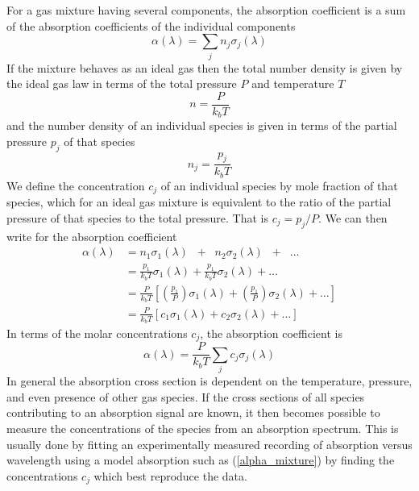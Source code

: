 For a gas mixture having several components, the absorption coefficient is a sum of the absorption coefficients of the individual components
\begin{equation}
	\alpha(\lambda) = \sum_j n_j \sigma_j(\lambda)
\end{equation}
If the mixture behaves as an ideal gas then the total number density is given by the ideal gas law in terms of the total pressure $P$ and temperature $T$
\begin{equation}
	n = \frac{P}{k_b T}
\end{equation}
and the number density of an individual species is given in terms of the partial pressure $p_j$ of that species
\begin{equation}
	n_j = \frac{p_j}{k_b T}
\end{equation}
We define the concentration $c_j$ of an individual species by mole fraction of that species, which for an ideal gas mixture is equivalent to the ratio of the partial pressure of that species to the total pressure. That is $c_j = p_j/P$. We can then write for the absorption coefficient
\begin{align}
	\alpha(\lambda) &= n_1 \sigma_1(\lambda) \;\; + \;\; n_2 \sigma_2(\lambda) \;\; + \;\; \ldots \nonumber \\
	&= \frac{p_1}{k_b T} \sigma_1(\lambda) + \frac{p_1}{k_b T} \sigma_2(\lambda) + \ldots \nonumber \\
	&= \frac{P}{k_b T} \left[\left(\frac{p_1}{P}\right)\sigma_1(\lambda) + \left(\frac{p_1}{P}\right) \sigma_2(\lambda) + \ldots \right] \nonumber\\
	&=\frac{P}{k_b T} \left[c_1\sigma_1(\lambda) + c_2 \sigma_2(\lambda) + \ldots \right]
\end{align}
In terms of the molar concentrations $c_j$, the absorption coefficient is
\begin{equation}\label{alpha_mixture}
	\alpha(\lambda) = \frac{P}{k_b T} \sum_j c_j\sigma_j(\lambda)
\end{equation}
In general the absorption cross section is dependent on the temperature, pressure, and even presence of other gas species. If the cross sections of all species contributing to an absorption signal are known, it then becomes possible to measure the concentrations of the species from an absorption spectrum. This is usually done by fitting an experimentally measured recording of absorption versus wavelength using a model absorption such as (\ref{alpha_mixture}) by finding the concentrations $c_j$ which best reproduce the data.

